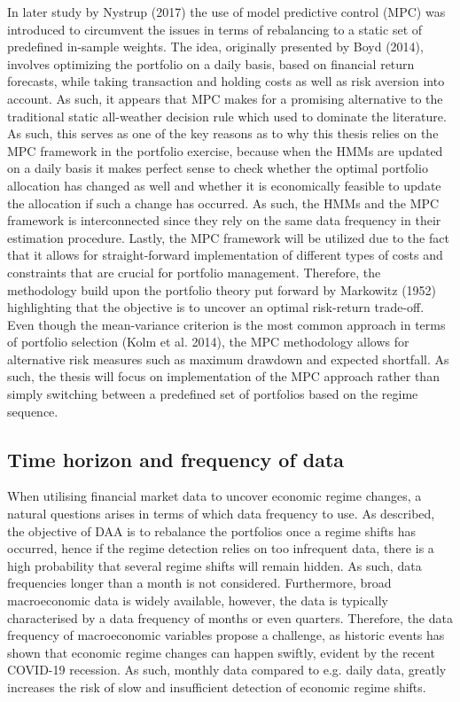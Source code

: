 In later study by Nystrup (2017) the use of model predictive control (MPC) was introduced to circumvent the issues in terms of rebalancing to a static set of predefined in-sample weights. The idea, originally presented by Boyd (2014), involves optimizing the portfolio on a daily basis, based on financial return forecasts, while taking transaction and holding costs as well as risk aversion into account. As such, it appears that MPC makes for a promising alternative to the traditional static all-weather decision rule which used to dominate the literature. As such, this serves as one of the key reasons as to why this thesis relies on the MPC framework in the portfolio exercise, because when the HMMs are updated on a daily basis it makes perfect sense to check whether the optimal portfolio allocation has changed as well and whether it is economically feasible to update the allocation if such a change has occurred. As such, the HMMs and the MPC framework is interconnected since they rely on the same data frequency in their estimation procedure. Lastly, the MPC framework will be utilized due to the fact that it allows for straight-forward implementation of different types of costs and constraints that are crucial for portfolio management. Therefore, the methodology build upon the portfolio theory put forward by Markowitz (1952) highlighting that the objective is to uncover an optimal risk-return trade-off. Even though the mean-variance criterion is the most common approach in terms of portfolio selection (Kolm et al. 2014), the MPC methodology allows for alternative risk measures such as maximum drawdown and expected shortfall. As such, the thesis will focus on implementation of the MPC approach rather than simply switching between a predefined set of portfolios based on the regime sequence.  


\subsection*{Time horizon and frequency of data}
\label{subsection: Data frequency}

When utilising financial market data to uncover economic regime changes, a natural questions arises in terms of which data frequency to use. As described, the objective of DAA is to rebalance the portfolios once a regime shifts has occurred, hence if the regime detection relies on too infrequent data, there is a high probability that several regime shifts will remain hidden. As such, data frequencies longer than a month is not considered. Furthermore, broad macroeconomic data is widely available, however, the data is typically characterised by a data frequency of months or even quarters. Therefore, the data frequency of macroeconomic variables propose a challenge, as historic events has shown that economic regime changes can happen swiftly, evident by the recent COVID-19 recession. As such, monthly data compared to e.g. daily data, greatly increases the risk of slow and insufficient detection of economic regime shifts.
 
